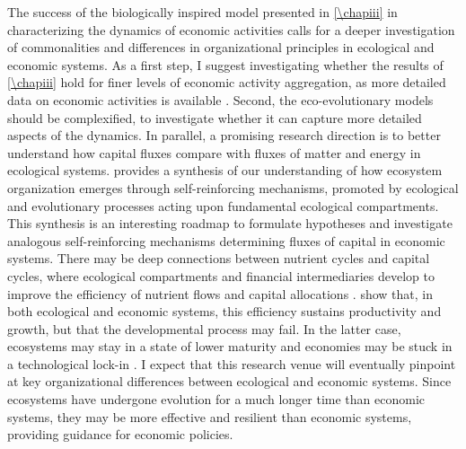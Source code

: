 The success of the biologically inspired model presented in \cref{\chapiii}  in characterizing the dynamics of economic activities calls for a deeper investigation of commonalities and differences in organizational principles in ecological and economic systems.
% 
As a first step, I suggest investigating whether the results of \cref{\chapiii} hold for finer levels of economic activity aggregation, as more detailed data on economic activities is available \citep{Hausmann2011}. 
% 
Second, the eco-evolutionary models should be complexified, to investigate whether it can capture more detailed aspects of the dynamics.
% 
In parallel, a promising research direction is to better understand how capital fluxes \citep{King1993} compare with fluxes of matter and energy \citep{Veldhuis2018} in ecological systems.
% 
\cite{Veldhuis2018} provides a synthesis of our understanding of how ecosystem organization emerges through self-reinforcing mechanisms, promoted by ecological and evolutionary processes acting upon fundamental ecological compartments. This synthesis is an interesting roadmap to formulate hypotheses and investigate analogous self-reinforcing mechanisms determining fluxes of capital in economic systems. 
% 
% 
% 
There may be deep connections between nutrient cycles and capital cycles, where ecological compartments and financial intermediaries develop to improve the efficiency of nutrient flows and capital allocations \citep{Odum1969}.
% 
\cite{Veldhuis2018,King1993} show that, in both ecological and economic systems, this efficiency sustains productivity and growth, but that the developmental process may fail. In the latter case, ecosystems may stay in a state of lower maturity \citep{Margalef1963} and economies may be stuck in a technological lock-in \citep{C.A.HidalgoB.Klinger}. 
% 
% 
% 
% 
I expect that this research venue will eventually pinpoint at key organizational differences between ecological and economic systems. Since ecosystems have undergone evolution for a much longer time than economic systems, they may be more effective and resilient than economic systems, providing guidance for economic policies.
